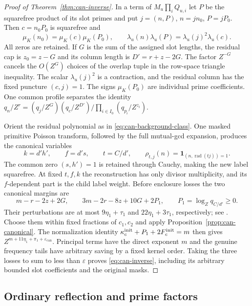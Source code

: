 \documentclass[11pt,a4paper]{article}
\numberwithin{equation}{section}
\theoremstyle{definition}
\theoremstyle{remark}
\newcommand{\eps}{\varepsilon}
\newcommand{\rad}{\operatorname{rad}}
\begin{document}
\begin{proof}[Proof of Theorem~\ref{thm:can-inverse}]
In a term of $M_u\prod_iQ_{u,i}$ let $P$ be the squarefree product
of its slot primes and put $j=(n,P)$, $n=jn_0$, $P=jP_0$.
Then $c=n_0P_0$ is squarefree and
\[
 \mu_K(n_0)=\mu_K(c)\mu_K(P_0),\qquad
 \lambda_u(n)\lambda_u(P)=\lambda_u(j)^2\lambda_u(c).
\]
All zeros are retained.  If $G$ is the sum of the assigned slot
lengths, the residual cap is $z_0=z-G$ and its column length is
$D'=r+z-2G$.  The factor $Z^{-G}$ cancels the $O(Z^G)$ choices of
the overlap tuple in the row-space triangle inequality.
The scalar $\lambda_u(j)^2$ is a contraction, and the residual
column has the fixed puncture $(c,j)=1$.
The signs $\mu_K(P_0)$ are individual prime coefficients.
One common profile separates the identity
$q_n/Z^r=(q_j/Z^G)(q_c/Z^{D'})/\prod_{i\in I_0}(q_{p_i}/Z^{z_i})$.

Orient the residual polynomial as in
\eqref{eq:can-background-class}.  One masked primitive Poisson
transform, followed by the full mutual-gcd expansion, produces
the canonical variables
\[
 k=d'h',\qquad f=d's,\qquad t=C/d',\qquad
 \rho_{t,j}(n)=\mathbf1_{(n,\rad(tj))=1}.
\]
The common zero $(s,h')=1$ is retained through Cauchy, making the
new label squarefree.  At fixed $t,f,k$ the reconstruction has only
divisor multiplicity, and its $f$-dependent part is the child label
weight.  Before enclosure losses the two canonical margins are
\begin{equation}\label{eq:can-initial-margins}
 m-r-2z+2G,\qquad 3m-2r-8z+10G+2P_1,
 \qquad P_1=\log_Zq_{C/d'}\ge0.
\end{equation}
Their perturbations are at most
$9\eta_1+\tau_1$ and $22\eta_1+3\tau_1$, respectively;
see \cite[(17.85)]{Q}.
Choose them within fixed fractions of $c_1,c_2$ and apply
Proposition~\ref{prop:can-canonical}.
The normalization identity
$\kappa_c^{\rm init}+P_1+2F_c^{\rm init}=m$
then gives $Z^{m+11\eta_1+\pi_1+\eps_{\mathrm{can}}}$.
Principal terms have the direct exponent $m$ and the genuine
frequency tails have arbitrary saving by a fixed kernel order.
Taking the three losses to sum to less than $\eps$ proves
\eqref{eq:can-inverse}, including its arbitrary bounded slot
coefficients and the original masks.
\end{proof}

\subsection{Ordinary reflection and prime factors}\label{subsec:ordinary-reflection}
\end{document}
